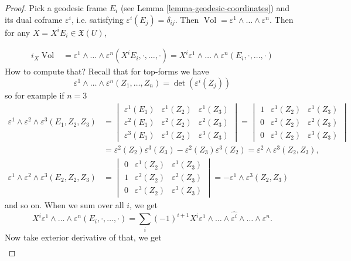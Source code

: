 \begin{proof}
Pick a geodesic frame $E_i$ (see Lemma \ref{lemma-geodesic-coordinates}) and
its dual coframe $\varepsilon^i$, i.e. satisfying
$\varepsilon^i(E_j)=\delta_{ij}$. Then $\operatorname{Vol}=\varepsilon^1
\wedge \ldots \wedge \varepsilon^n$. Then for any $X=X^iE_i \in
\mathfrak{X}(U)$,

\begin{align*}
i_X\operatorname{Vol}
&=\varepsilon^1\wedge\ldots\wedge\varepsilon^n(X^iE_i,\cdot,\ldots,\cdot)
=X^i\varepsilon^1\wedge\ldots\wedge\varepsilon^n(E_i,\cdot,\ldots,\cdot)
\end{align*}
How to compute that? Recall that for top-forms we have
$$
\varepsilon^1\wedge\ldots\wedge\varepsilon^n(Z_1,\ldots,Z_n)
=\det(\varepsilon^i(Z_j))
$$
so for example if $n=3$
\begin{align*}\varepsilon^1\wedge \varepsilon^2\wedge\varepsilon^3(E_1,Z_2,Z_3)
&=\begin{vmatrix}
\varepsilon^1(E_1)&\varepsilon^1(Z_2) &\varepsilon^1(Z_3)\\
\varepsilon^2(E_1)&\varepsilon^2(Z_2)&\varepsilon^2(Z_3)\\
\varepsilon^3(E_1)&\varepsilon^3(Z_2)&\varepsilon^3(Z_3)
\end{vmatrix}
=\begin{vmatrix}
1&\varepsilon^1(Z_2) &\varepsilon^1(Z_3)\\
0&\varepsilon^2(Z_2)&\varepsilon^2(Z_3)\\
0&\varepsilon^3(Z_2)&\varepsilon^3(Z_3)
\end{vmatrix}\\
&=\varepsilon^2(Z_2)\varepsilon^3(Z_3)-\varepsilon^2(Z_3)\varepsilon^3(Z_2)
=\varepsilon^2\wedge\varepsilon^3(Z_2,Z_3),\\
\varepsilon^1\wedge\varepsilon^2\wedge\varepsilon^3(E_2,Z_2,Z_3)
&=\begin{vmatrix}
0&\varepsilon^1(Z_2) &\varepsilon^1(Z_3)\\
1&\varepsilon^2(Z_2)&\varepsilon^2(Z_3)\\
0&\varepsilon^3(Z_2)&\varepsilon^3(Z_3)
\end{vmatrix}=-\varepsilon^1\wedge\varepsilon^3(Z_2,Z_3)
\end{align*}
and so on. When we sum over all $i$, we get
$$
X^i\varepsilon^1\wedge\ldots\wedge\varepsilon^n(E_i,\cdot,\ldots,\cdot)
=\sum_{i}(-1)^{i+1}X^i\varepsilon^1\wedge\ldots\wedge\widehat{\varepsilon^i}
\wedge\ldots\wedge\varepsilon^n.
$$
Now take exterior derivative of that, we get
\begin{align*}

\end{align*}
\end{proof}
